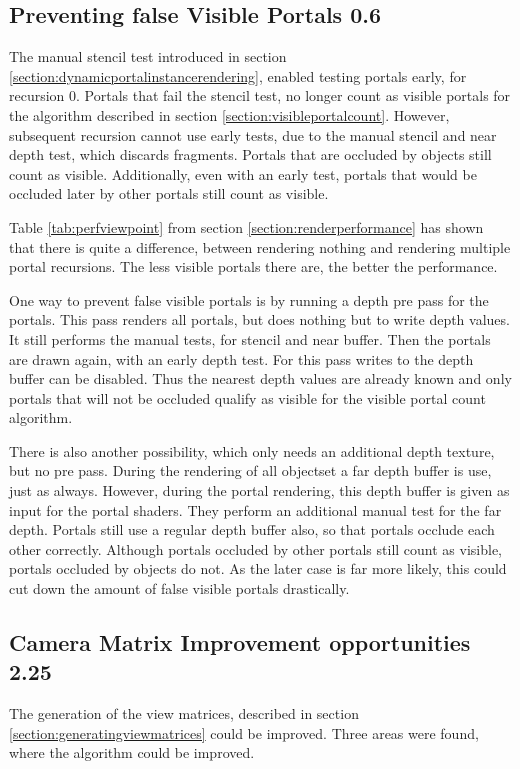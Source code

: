 \subsection{Preventing false Visible Portals 0.6}
\label{section:falsevisible}
The manual stencil test introduced in section \ref{section:dynamicportalinstancerendering}, enabled testing portals early, for recursion 0. Portals that fail the stencil test, no longer count as visible portals for the algorithm described in section \ref{section:visibleportalcount}. However, subsequent recursion cannot use early tests, due to the manual stencil and near depth test, which discards fragments. Portals that are occluded by objects still count as visible. Additionally, even with an early test, portals that would be occluded later by other portals still count as visible.

Table \ref{tab:perfviewpoint} from section \ref{section:renderperformance} has shown that there is quite a difference, between rendering nothing and rendering multiple portal recursions. The less visible portals there are, the better the performance.


One way to prevent false visible portals is by running a depth pre pass for the portals. This pass renders all portals, but does nothing but to write depth values. It still performs the manual tests, for stencil and near buffer. Then the portals are drawn again, with an early depth test. For this pass writes to the depth buffer can be disabled. Thus the nearest depth values are already known and only portals that will not be occluded qualify as visible for the visible portal count algorithm.

There is also another possibility, which only needs an additional depth texture, but no pre pass. During the rendering of all \gls{objectset} a far depth buffer is use, just as always. However, during the portal rendering, this depth buffer is given as input for the portal shaders. They perform an additional manual test for the far depth. Portals still use a regular depth buffer also, so that portals occlude each other correctly. Although portals occluded by other portals still count as visible, portals occluded by objects do not. As the later case is far more likely, this could cut down the amount of false visible portals drastically.




\subsection{Camera Matrix Improvement opportunities 2.25}
The generation of the view matrices, described in section \ref{section:generatingviewmatrices} could be improved. Three areas were found, where the algorithm could be improved.

